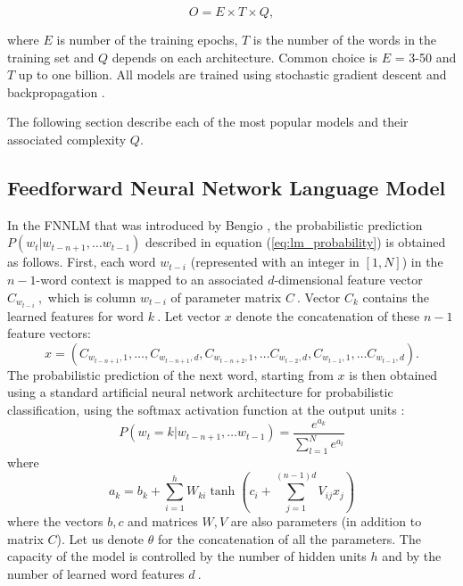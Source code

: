 \begin{center}
\begin{equation} O = E \times T \times Q,   \end{equation}
\end{center}

where $E$ is number of the training epochs, $T$ is the number of the words in
the training set and $Q$ depends on each architecture. Common choice is $E$ = 3-50 and $T$ up to one billion.
All models are trained using stochastic gradient descent and backpropagation
\cite{Bengio:2003:NPL:944919.944966,DBLP:journals/corr/abs-1301-3781}.

The following section describe each of the most popular models and their
associated complexity $Q$.



\subsection{Feedforward Neural Network Language Model}
\label{subsec:fwd-neural-net-lm}


In the \ac{FNNLM} that was introduced by Bengio
\cite{Bengio:2003:NPL:944919.944966},  the probabilistic prediction $P(w_t | w_{t-n+1}, \ldots w_{t-1})$ described
in equation (\ref{eq:lm_probability}) is obtained as follows. First, each word $w_{t-i}$ (represented
with an integer in $[1,N]$) in the  $n-1$-word context is mapped
to an associated $d$-dimensional feature vector $C_{w_{t-i}}\ ,$ which is
column $w_{t-i}$ of parameter matrix $C\ .$ Vector $C_k$
contains the learned features for word $k\ .$
Let vector $x$ denote the concatenation of these $n-1$
feature vectors:
\begin{equation}
  x = (C_{w_{t-n+1},1}, \ldots, C_{w_{t-n+1},d}, C_{w_{t-n+2},1}, \ldots C_{w_{t-2},d}, C_{w_{t-1},1}, \ldots C_{w_{t-1},d}).
\end{equation}
The probabilistic prediction of the next word, starting from $x$
is then obtained using a standard artificial neural network architecture
for probabilistic classification, using the softmax activation function at the output units \cite{Bishop:1995:NNP:525960}:
\begin{equation}
 P(w_t=k | w_{t-n+1}, \ldots w_{t-1}) = \frac{e^{a_k}}{\sum_{l=1}^N e^{a_l}}
\end{equation}
where
\begin{equation}
 a_k = b_k + \sum_{i=1}^h W_{ki} \tanh(c_i + \sum_{j=1}^{(n-1)d} V_{ij} x_j)
\end{equation}
where the vectors $b,c$ and matrices $W,V$ are also
parameters (in addition to matrix $C$). Let us denote
$\theta$ for the concatenation of all the parameters.
The capacity of the model is controlled by the number of hidden units $h$
and by the number of learned word features $d\ .$ 


